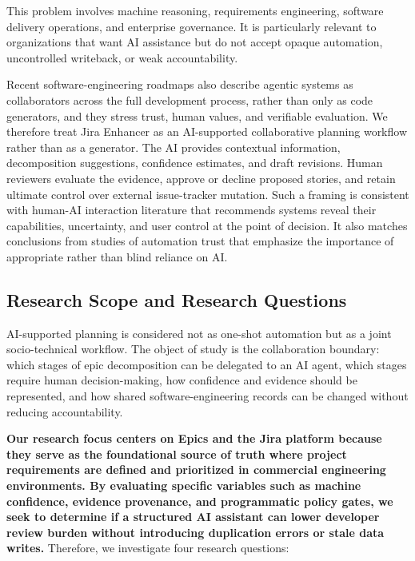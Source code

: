 \documentclass[manuscript,review]{acmart}
\begin{document}
This problem involves machine reasoning, requirements engineering, software delivery operations, and enterprise governance. It is particularly relevant to organizations that want AI assistance but do not accept opaque automation, uncontrolled writeback, or weak accountability.

Recent software-engineering roadmaps also describe agentic systems as collaborators across the full development process, rather than only as code generators, and they stress trust, human values, and verifiable evaluation. We therefore treat Jira Enhancer as an AI-supported collaborative planning workflow rather than as a generator. The AI provides contextual information, decomposition suggestions, confidence estimates, and draft revisions. Human reviewers evaluate the evidence, approve or decline proposed stories, and retain ultimate control over external issue-tracker mutation. Such a framing is consistent with human-AI interaction literature that recommends systems reveal their capabilities, uncertainty, and user control at the point of decision. It also matches conclusions from studies of automation trust that emphasize the importance of appropriate rather than blind reliance on AI.

\subsection{Research Scope and Research Questions}
AI-supported planning is considered not as one-shot automation but as a joint socio-technical workflow. The object of study is the collaboration boundary: which stages of epic decomposition can be delegated to an AI agent, which stages require human decision-making, how confidence and evidence should be represented, and how shared software-engineering records can be changed without reducing accountability.

\textbf{Our research focus centers on Epics and the Jira platform because they serve as the foundational source of truth where project requirements are defined and prioritized in commercial engineering environments. By evaluating specific variables such as machine confidence, evidence provenance, and programmatic policy gates, we seek to determine if a structured AI assistant can lower developer review burden without introducing duplication errors or stale data writes.} Therefore, we investigate four research questions:
\end{document}
